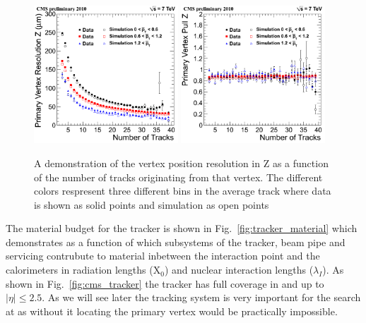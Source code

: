 \begin{figure}
  \includegraphics[width=0.48\textwidth]{ch2_cms_exp/plots/ResZ_byPt.png}
  \includegraphics[width=0.48\textwidth]{ch2_cms_exp/plots/PullZ_byPt.png}
  \caption[Vertex resolution]{A demonstration of the vertex position resolution in Z as a function of the number of tracks originating from that vertex. The different colors respresent three different bins in the average track \pT where data is shown as solid points and simulation as open points~\cite{cms-tracker-performance-2010} }
  \label{fig:tracker_vertex_resolution}
\end{figure}

The material budget for the tracker is shown in Fig.~\ref{fig:tracker_material} which demonstrates as a function of \eta which subsystems of the tracker, beam pipe and servicing contrubute to material inbetween the interaction point and the calorimeters in radiation lengths (X$_{0}$) and nuclear interaction lengths ($\lambda_{I}$). As shown in Fig.~\ref{fig:cms_tracker} the tracker has full coverage in \phi and up to $|\eta|\leq2.5$. As we will see later the tracking system is very important for the \Hgg search at \CMS as without it locating the primary vertex would be practically impossible.

